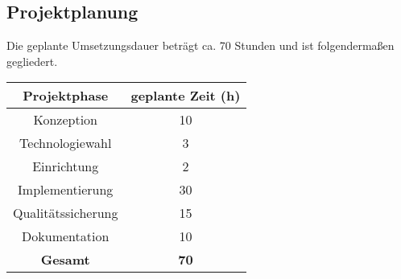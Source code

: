 \subsection{Projektplanung}
Die geplante Umsetzungsdauer beträgt ca. 70 Stunden und ist folgendermaßen
gegliedert.

\begin{center}
    \begin{tabular}{ |c|c| }
        \hline
        \textbf{Projektphase} & \textbf{geplante Zeit (h)} \\ \hline
        Konzeption            & 10                         \\
        Technologiewahl       & 3                          \\
        Einrichtung           & 2                          \\
        Implementierung       & 30                         \\
        Qualitätssicherung    & 15                         \\
        Dokumentation         & 10                         \\ \hline
        \textbf{Gesamt}       & \textbf{70}                \\
        \hline
    \end{tabular}
\end{center}